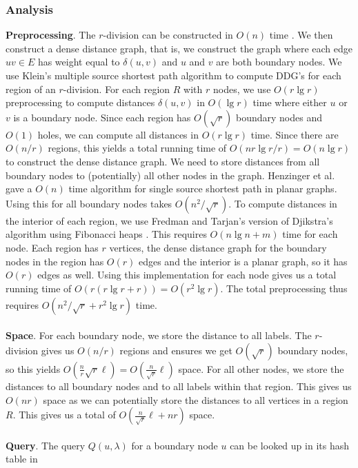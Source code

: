 \subsubsection{Analysis}
\textbf{Preprocessing}. The $r$-division can be constructed in $O(n)$ time \cite{klein2013structured}. We then
construct a dense distance graph, that is, we construct the graph where each edge $uv\in
E$ has weight equal to $\delta(u,v)$ and $u$ and $v$ are both boundary nodes. We use
Klein's multiple source shortest path algorithm \cite{klein2005multiple} to compute DDG's
for each region of an $r$-division. For each region $R$ with $r$ nodes, we use $O(r\lg
r)$ preprocessing to compute distances $\delta(u,v)$ in $O(\lg r)$ time where either $u$
or $v$ is a boundary node. Since each region has $O(\sqrt{r})$ boundary nodes and $O(1)$
holes, we can compute all distances in $O(r\lg r)$ time. Since there are $O(n/r)$
regions, this yields a total running time of $O(nr\lg r/r)=O(n\lg r)$ to construct the
dense distance graph. We need to store distances from all boundary nodes to (potentially)
all other nodes in the graph. Henzinger et al. \cite{henzinger1997faster} gave a $O(n)$
time algorithm for single source shortest path in planar graphs. Using this for all
boundary nodes takes $O(n^2/\sqrt{r})$. To compute distances in the interior of each
region, we use Fredman and Tarjan's version of Djikstra's algorithm using Fibonacci heaps
\cite{fredman1987fibonacci}. This requires $O(n\lg n + m)$ time for each node. Each
region has $r$ vertices, the dense distance graph for the boundary nodes in the region has
$O(r)$ edges and the interior is a planar graph, so it has $O(r)$ edges as well. Using
this implementation for each node gives us a total running time of $O(r(r\lg r + r))=O(r^2\lg
r)$. The total preprocessing thus requires $O(n^2/\sqrt{r}+r^2\lg r)$ time. \\
\\
\textbf{Space}. For each boundary node, we store the distance to all labels. The $r$-division gives us
$O(n/r)$ regions and ensures we
get $O(\sqrt{r})$ boundary nodes, so this yields
$O(\frac{n}{r}\sqrt{r}\ell)=O(\frac{n}{\sqrt{r}}\ell)$ space. For all other nodes, we
store the distances to all boundary nodes and to all labels within that region. This
gives us $O(nr)$ space as we can potentially store the distances to all vertices in a
region $R$. This gives us a total of $O(\frac{n}{\sqrt{r}}\ell+nr)$ space. \\
\\
\textbf{Query}. The query $Q(u,\lambda)$ for a boundary node $u$ can be looked up in its hash table in

